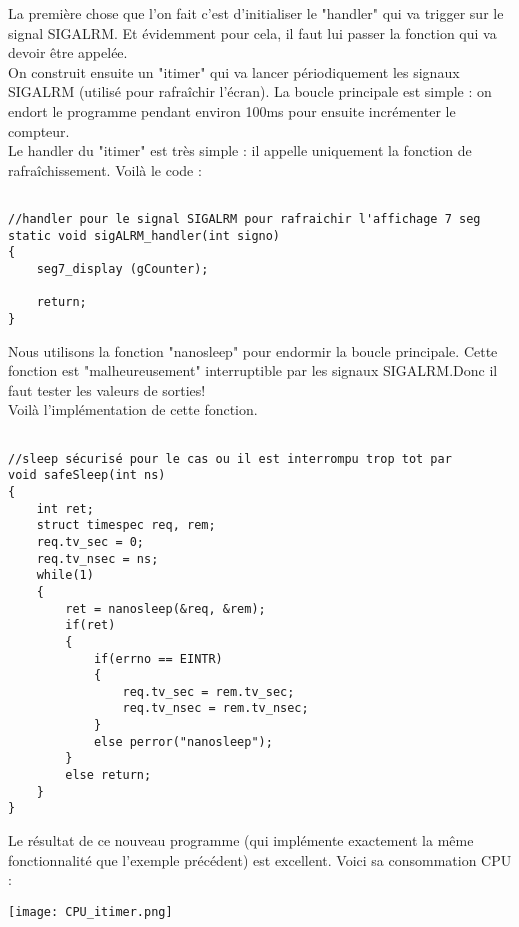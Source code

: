 La première chose que l'on fait c'est d'initialiser le "handler" qui va trigger sur le signal SIGALRM. Et évidemment pour cela, il faut lui passer la fonction qui va devoir être appelée.\\
 

On construit ensuite un "itimer" qui va lancer périodiquement les signaux SIGALRM (utilisé pour rafraîchir l'écran).
La boucle principale est simple : on endort le programme pendant environ 100ms pour ensuite incrémenter le compteur.\\


Le handler du "itimer" est très simple : il appelle uniquement la fonction de rafraîchissement. Voilà le code :

\begin{lstlisting}[frame=single,style=C]  % Start your code-block

//handler pour le signal SIGALRM pour rafraichir l'affichage 7 seg
static void sigALRM_handler(int signo)
{
	seg7_display (gCounter);
	
	return;
}
\end{lstlisting}


Nous utilisons la fonction "nanosleep" pour endormir la boucle principale. Cette fonction est "malheureusement" interruptible par les signaux SIGALRM.Donc il faut tester les valeurs de sorties!\\


Voilà l'implémentation de cette fonction.

 
\begin{lstlisting}[frame=single,style=C]  % Start your code-block

//sleep sécurisé pour le cas ou il est interrompu trop tot par
void safeSleep(int ns)
{
	int ret;
	struct timespec req, rem;
	req.tv_sec = 0;
	req.tv_nsec = ns;
	while(1)
	{
		ret = nanosleep(&req, &rem);
		if(ret)
		{
			if(errno == EINTR)
			{
				req.tv_sec = rem.tv_sec;
				req.tv_nsec = rem.tv_nsec;
			}
			else perror("nanosleep");
		}
		else return;
	}
}
\end{lstlisting}

Le résultat de ce nouveau programme (qui implémente exactement la même fonctionnalité que l'exemple précédent) est excellent. Voici sa consommation CPU :

\begin{center} 
\hspace{12.45cm}
\texttt{[image: CPU\_itimer.png]}
\end{center}
\vspace{1cm}


